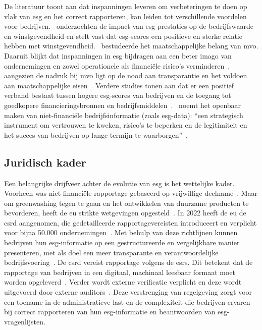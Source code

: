 De literatuur toont aan dat inspanningen leveren om verbeteringen te doen op vlak van \gls{esg} en het correct rapporteren, kan leiden tot verschillende voordelen voor bedrijven.~\textcite{Aydogmus2022} onderzochten de impact van \gls{esg}-prestaties op de bedrijfswaarde en winstgevendheid en stelt vast dat \gls{esg}-scores een positieve en sterke relatie hebben met winstgevendheid.~\textcite{Radzi2023} bestudeerde het maatschappelijke belang van \gls{mvo}. Daaruit blijkt dat inspanningen in \gls{esg} bijdragen aan een beter imago van ondernemingen en zowel operationele als financiële risico’s verminderen~\autocite{Radzi2023}, aangezien de nadruk bij \gls{mvo} ligt op de nood aan transparantie en het voldoen aan maatschappelijke eisen~\autocite{Fornasari2024}. Verdere studies tonen aan dat er een positief verband bestaat tussen hogere \gls{esg}-scores van bedrijven en de toegang tot goedkopere financieringsbronnen en bedrijfsmiddelen~\autocite{Gholami2022}.~\textcite{Fornasari2024} noemt het openbaar maken van niet-financiële bedrijfsinformatie (zoals \gls{esg}-data): ``een strategisch instrument om vertrouwen te kweken, risico's te beperken en de legitimiteit en het succes van bedrijven op lange termijn te waarborgen''~\autocite{Fornasari2024}.

\subsection{Juridisch kader}

Een belangrijke drijfveer achter de evolutie van \gls{esg} is het wettelijke kader. Voorheen was niet-financiële rapportage gebaseerd op vrijwillige deelname~\autocite{Centre.2023}. Maar om \gls{greenwashing} tegen te gaan en het ontwikkelen van duurzame producten te bevorderen, heeft de \gls{eu} strikte wetgevingen opgesteld~\autocite{Koch2025,Commission2020}. In 2022 heeft de \gls{eu} de \gls{csrd} aangenomen, die gedetailleerde rapportagevereisten introduceert en verplicht voor bijna 50.000 ondernemingen~\autocite{Fornasari2024,AccountancyEurope2024,kpmg2025sustainability}. Met behulp van deze richtlijnen kunnen bedrijven hun \gls{esg}-informatie op een gestructureerde en vergelijkbare manier presenteren, met als doel een meer transparante en verantwoordelijke bedrijfsvoering~\autocite{Darnall2022}. De \gls{csrd} vereist rapportage volgens de \gls{esrs}. Dit betekent dat de rapportage van bedrijven in een digitaal, machinaal leesbaar formaat moet worden opgeleverd~\autocite{Centre.2023}. Verder wordt externe verificatie verplicht en deze wordt uitgevoerd door externe auditors~\autocite{Centre.2023}. Deze verstrenging van regelgeving zorgt voor een toename in de administratieve last en de complexiteit die bedrijven ervaren bij correct rapporteren van hun \gls{esg}-informatie en beantwoorden van \gls{esg}-vragenlijsten.

